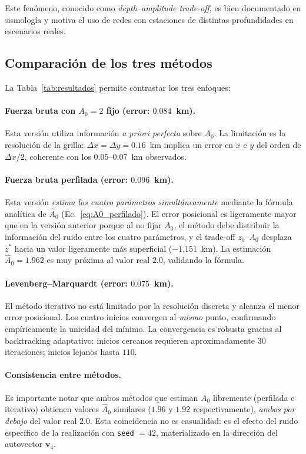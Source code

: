 \documentclass[12pt, a4paper]{article}
\begin{document}
Este fenómeno, conocido como \emph{depth--amplitude trade-off}, es
bien documentado en sismología \cite{thurber1985nonlinear,
husen2010earthquake} y motiva el uso de redes con estaciones de
distintas profundidades en escenarios reales.

\subsection{Comparación de los tres métodos}

La Tabla~\ref{tab:resultados} permite contrastar los tres enfoques:

\paragraph{Fuerza bruta con $A_0 = 2$ fijo (error: $0.084$~km).}
Esta versión utiliza información \emph{a priori perfecta} sobre
$A_0$. La limitación es la resolución de la grilla:
$\Delta x = \Delta y = 0.16$~km implica un error en $x$ e $y$ del orden
de $\Delta x/2$, coherente con los $0.05$--$0.07$~km observados.

\paragraph{Fuerza bruta perfilada (error: $0.096$~km).}
Esta versión \emph{estima los cuatro parámetros simultáneamente}
mediante la fórmula analítica de $\widehat{A}_0$
(Ec.~\ref{eq:A0_perfilado}). El error posicional es ligeramente mayor
que en la versión anterior porque al no fijar $A_0$, el método
debe distribuir la información del ruido entre los cuatro parámetros,
y el trade-off $z_0$--$A_0$ desplaza $z^*$ hacia un valor ligeramente
más superficial ($-1.151$~km). La estimación $\widehat{A}_0 = 1.962$
es muy próxima al valor real $2.0$, validando la fórmula.

\paragraph{Levenberg--Marquardt (error: $0.075$~km).}
El método iterativo no está limitado por la resolución discreta y
alcanza el menor error posicional. Los cuatro inicios convergen al
\emph{mismo} punto, confirmando empíricamente la unicidad del mínimo.
La convergencia es robusta gracias al backtracking adaptativo:
inicios cercanos requieren aproximadamente $30$ iteraciones; inicios
lejanos hasta $110$.

\paragraph{Consistencia entre métodos.}
Es importante notar que ambos métodos que estiman $A_0$ libremente
(perfilada e iterativo) obtienen valores $\widehat{A}_0$ similares
($1.96$ y $1.92$ respectivamente), \emph{ambos por debajo} del valor
real $2.0$. Esta coincidencia no es casualidad: es el efecto del
ruido específico de la realización con \texttt{seed} $=42$,
materializado en la dirección del autovector $\mathbf{v}_4$.
\end{document}
